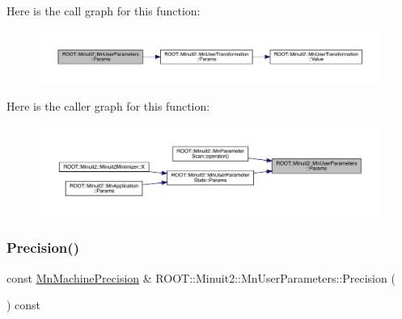 Here is the call graph for this function\+:\nopagebreak
\begin{figure}[H]
\begin{center}
\leavevmode
\includegraphics[width=350pt]{d6/d10/classROOT_1_1Minuit2_1_1MnUserParameters_a0f718b770e7fbeb503f83d8f27ca10f0_cgraph}
\end{center}
\end{figure}
Here is the caller graph for this function\+:\nopagebreak
\begin{figure}[H]
\begin{center}
\leavevmode
\includegraphics[width=350pt]{d6/d10/classROOT_1_1Minuit2_1_1MnUserParameters_a0f718b770e7fbeb503f83d8f27ca10f0_icgraph}
\end{center}
\end{figure}
\mbox{\label{classROOT_1_1Minuit2_1_1MnUserParameters_a52f62fcd0d9d9f6e907b07cc0194f547}} 
\subsubsection{\texorpdfstring{Precision()}{Precision()}\hspace{0.1cm}{\footnotesize\ttfamily [1/2]}}
{\footnotesize\ttfamily const \mbox{\hyperlink{classROOT_1_1Minuit2_1_1MnMachinePrecision}{Mn\+Machine\+Precision}} \& R\+O\+O\+T\+::\+Minuit2\+::\+Mn\+User\+Parameters\+::\+Precision (\begin{DoxyParamCaption}{ }\end{DoxyParamCaption}) const}

